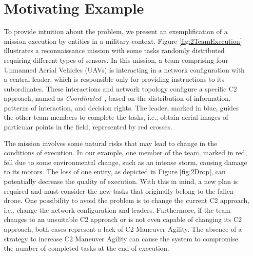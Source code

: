 \section{Motivating Example}
\label{sec:motivation}

To provide intuition about the problem, we present an exemplification of a mission execution by entities in a military context. Figure \ref{fig:2TeamExecution} illustrates a reconnaissance mission with some tasks randomly distributed requiring different types of sensors. In this mission, a team comprising four Unmanned Aerial Vehicles (UAVs) is interacting in a network configuration with a central leader, which is responsible only for providing instructions to its subordinates. These interactions and network topology configure a specific C2 approach, named as \textit{Coordinated}~\citep{france2014}, based on the distribution of information, patterns of interaction, and decision rights. The leader, marked in blue, guides the other team members to complete the tasks, i.e., obtain aerial images of particular points in the field, represented by red crosses.

The mission involves some natural risks that may lead to change in the conditions of execution. In our example, one member of the team, marked in red, fell due to some environmental change, such as an intense storm, causing damage to its motors. The loss of one entity, as depicted in Figure \ref{fig:2Drop}, can potentially decrease the quality of execution. With this in mind, a new plan is required and must consider the new tasks that originally belong to the fallen drone. One possibility to avoid the problem is to change the current C2 approach, i.e., change the network configuration and leaders. Furthermore, if the team changes to an unsuitable C2 approach or is not even capable of changing its C2 approach, both cases represent a lack of C2 Maneuver Agility. The absence of a strategy to increase C2 Maneuver Agility can cause the system to compromise the number of completed tasks at the end of execution. 


